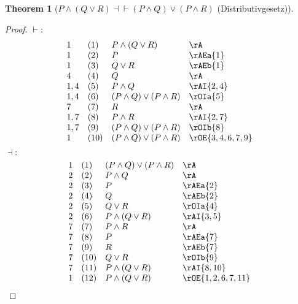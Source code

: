 \documentclass{book}
\theoremstyle{plain}
\newtheorem{theorem}{Theorem}
\theoremstyle{remark}
\theoremstyle{definition}
\begin{document}
\label{PAndLpQOrRRpEqvLpPAndQRpOrLpPAndRRp}
\begin{theorem}[\(P \land (Q\lor R) \dashv \vdash  (P \land Q) \lor (P\land R)\) (Distributivgesetz)]
\end{theorem}
\begin{proof}
	\(\vdash:\)
	\[
	\begin{array}{llll}
		1 & (1) & P \land (Q\lor R) & \rA \\
		1 & (2) & P & \rAEa{1} \\
		1 & (3) & Q\lor R & \rAEb{1} \\
		4 & (4) & Q & \rA \\
		1,4 & (5) & P \land Q & \rAI{2,4} \\
		1,4 & (6) & (P \land Q) \lor (P\land R) & \rOIa{5} \\
		7 & (7) & R & \rA \\
		1,7 & (8) & P \land R & \rAI{2,7} \\
		1,7 & (9) & (P \land Q) \lor (P\land R) & \rOIb{8} \\
		1 & (10) & (P \land Q) \lor (P\land R) & \rOE{3,4,6,7,9} \\
	\end{array}
	\]
	\(\dashv:\)
	\[
	\begin{array}{llll}
		1 & (1) & (P \land Q) \lor (P\land R) & \rA \\
		2 & (2) & P \land Q & \rA \\
		2 & (3) & P & \rAEa{2} \\
		2 & (4) & Q & \rAEb{2} \\
		2 & (5) & Q \lor R & \rOIa{4} \\
		2 & (6) & P \land (Q \lor R) & \rAI{3,5} \\
		7 & (7) & P \land R & \rA \\
		7 & (8) & P & \rAEa{7} \\
		7 & (9) & R & \rAEb{7} \\
		7 & (10) & Q \lor R & \rOIb{9} \\
		7 & (11) & P \land (Q \lor R) & \rAI{8,10} \\
		1 & (12) & P \land (Q \lor R) & \rOE{1,2,6,7,11} 
	\end{array}
	\]
\end{proof}
\end{document}
